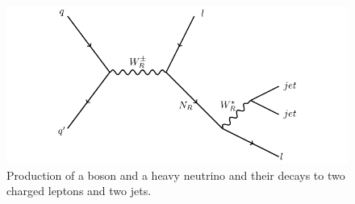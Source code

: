 \begin{figure}[h]
	\centering
	\includegraphics[width=1.0\textwidth]{figures/feynman.pdf}
	\caption{Production of a \WR boson and a heavy neutrino \nul and their decays to two charged leptons and two jets.}
	\label{fig:wrFeynmanDiagram}
\end{figure}


